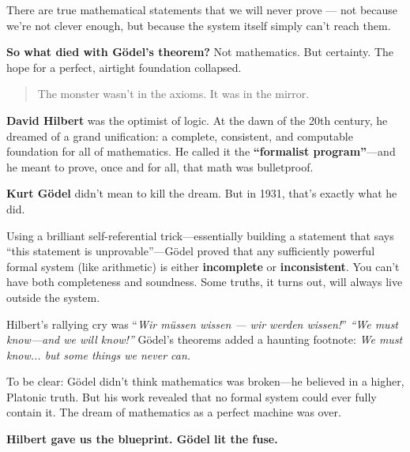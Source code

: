 There are true mathematical statements that we will never prove — not because we’re not clever enough, but because the system itself simply can’t reach them.

\medskip

\noindent\textbf{So what died with Gödel’s theorem?} Not mathematics. But certainty. The hope for a perfect, airtight foundation collapsed.

\begin{quote}
The monster wasn’t in the axioms. It was in the mirror.
\end{quote}


\begin{tcolorbox}[colback=blue!5!white, colframe=blue!50!black, 
  title={Historical Sidebar: Gödel and Hilbert—The Dream and the Detonation}]
  
  \textbf{David Hilbert} was the optimist of logic. At the dawn of the 20th century, he dreamed of a grand unification: a complete, consistent, and computable foundation for all of mathematics. He called it the \textbf{“formalist program”}—and he meant to prove, once and for all, that math was bulletproof.
  
  \medskip
  
  \textbf{Kurt Gödel} didn’t mean to kill the dream. But in 1931, that’s exactly what he did.
  
  Using a brilliant self-referential trick—essentially building a statement that says “this statement is unprovable”—Gödel proved that any sufficiently powerful formal system (like arithmetic) is either \textbf{incomplete} or \textbf{inconsistent}. You can’t have both completeness and soundness. Some truths, it turns out, will always live outside the system.
  
  \medskip
  
  Hilbert’s rallying cry was “\textit{Wir müssen wissen — wir werden wissen!}”  
  \emph{“We must know—and we will know!”}  
  Gödel’s theorems added a haunting footnote:  
  \emph{We must know... but some things we never can.}
  
  \medskip
  
  To be clear: Gödel didn’t think mathematics was broken—he believed in a higher, Platonic truth. But his work revealed that no formal system could ever fully contain it. The dream of mathematics as a perfect machine was over.
  
  \medskip
  
  \textbf{Hilbert gave us the blueprint. Gödel lit the fuse.}
  
\end{tcolorbox}


